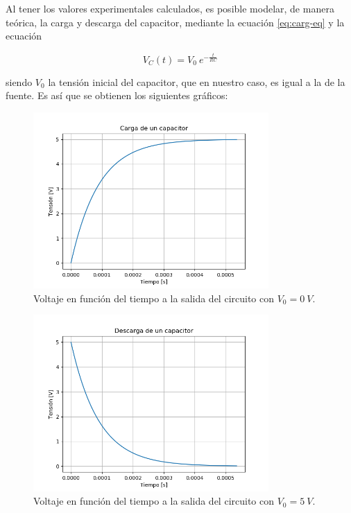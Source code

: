 \documentclass[a4paper]{article}
\begin{document}
Al tener los valores experimentales calculados, es posible modelar, de manera teórica, la carga y descarga del capacitor, mediante la ecuación \ref{eq:carg-eq} y la ecuación

\begin{equation}
	V_{C} (t) = V_{0} \ e^{-\frac{t}{RC}} 
	\label{eq:des-eq}
\end{equation}

siendo $ V_{0} $ la tensión inicial del capacitor, que en nuestro caso, es igual a la de la fuente.
Es así que se obtienen los siguientes gráficos:

\begin{figure}[H]
	\centering
	\includegraphics[width=0.8\textwidth]{Carga-transitoria-teorica.png}
\caption{Voltaje en función del tiempo a la salida del circuito con $ V_{0} = 0\ V $.}
	\label{fig:carg-teo}
\end{figure}

\begin{figure}[H]
	\centering
	\includegraphics[width=0.8\textwidth]{Descarga-transitoria-teorica.png}
	\caption{Voltaje en función del tiempo a la salida del circuito con $ V_{0} = 5\ V $.}
	\label{fig:desc-teo}
\end{figure}
\end{document}
